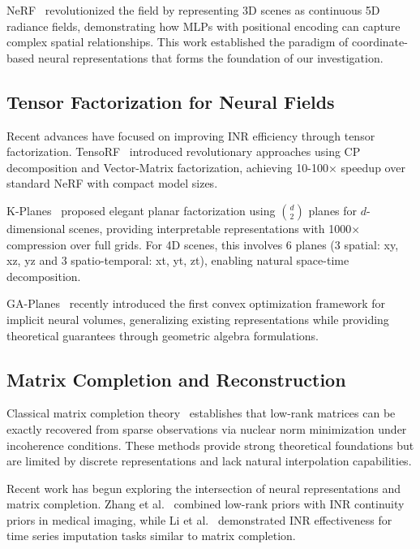 \documentclass[10pt,twocolumn,letterpaper]{article}
\begin{document}
NeRF~\cite{mildenhall2020nerf} revolutionized the field by representing 3D scenes as continuous 5D radiance fields, demonstrating how MLPs with positional encoding can capture complex spatial relationships. This work established the paradigm of coordinate-based neural representations that forms the foundation of our investigation.

\subsection{Tensor Factorization for Neural Fields}

Recent advances have focused on improving INR efficiency through tensor factorization. TensoRF~\cite{chen2022tensorf} introduced revolutionary approaches using CP decomposition and Vector-Matrix factorization, achieving 10-100× speedup over standard NeRF with compact model sizes.

K-Planes~\cite{fridovich2023kplanes} proposed elegant planar factorization using $\binom{d}{2}$ planes for $d$-dimensional scenes, providing interpretable representations with 1000× compression over full grids. For 4D scenes, this involves 6 planes (3 spatial: xy, xz, yz and 3 spatio-temporal: xt, yt, zt), enabling natural space-time decomposition.

GA-Planes~\cite{sivgin2024gaplanes} recently introduced the first convex optimization framework for implicit neural volumes, generalizing existing representations while providing theoretical guarantees through geometric algebra formulations.

\subsection{Matrix Completion and Reconstruction}

Classical matrix completion theory~\cite{candes2009matrix,recht2011simpler} establishes that low-rank matrices can be exactly recovered from sparse observations via nuclear norm minimization under incoherence conditions. These methods provide strong theoretical foundations but are limited by discrete representations and lack natural interpolation capabilities.

Recent work has begun exploring the intersection of neural representations and matrix completion. Zhang et al.~\cite{zhang2025lorein} combined low-rank priors with INR continuity priors in medical imaging, while Li et al.~\cite{li2025imputeinr} demonstrated INR effectiveness for time series imputation tasks similar to matrix completion.
\end{document}
